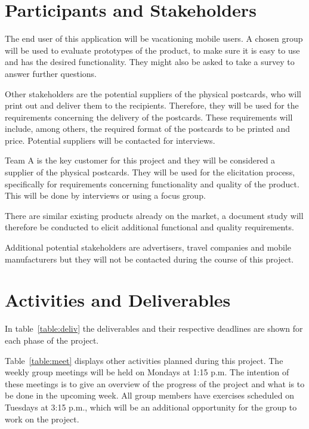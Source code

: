 \documentclass[10pt,a4paper]{article}
\begin{document}
\section{Participants and Stakeholders}

The end user of this application will be vacationing mobile users. A chosen group will be used to evaluate prototypes of the product, to make sure it is easy to use and has the desired functionality. They might also be asked to take a survey to answer further questions.

Other stakeholders are the potential suppliers of the physical postcards, who will print out and deliver them to the recipients. Therefore, they will be used for the requirements concerning the delivery of the postcards. These requirements will include, among others, the required format of the postcards to be printed and price. Potential suppliers will be contacted for interviews.

Team A is the key customer for this project and they will be considered a supplier of the physical postcards. They will be used for the elicitation process, specifically for requirements concerning functionality and quality of the product. This will be done by interviews or using a focus group. 

There are similar existing products already on the market, a document study will therefore be conducted to elicit additional functional and quality requirements. 

Additional potential stakeholders are advertisers, travel companies and mobile manufacturers but they will not be contacted during the course of this project.

\section{Activities and Deliverables}

In table~\ref{table:deliv} the deliverables and their respective deadlines are shown for each phase of the project. 

Table~\ref{table:meet} displays other activities planned during this project. The weekly group meetings will be held on Mondays at 1:15 p.m. The intention of these meetings is to give an overview of the progress of the project and what is to be done in the upcoming week. All group members have exercises scheduled on Tuesdays at 3:15 p.m., which will be an additional opportunity for the group to work on the project. 
\end{document}
